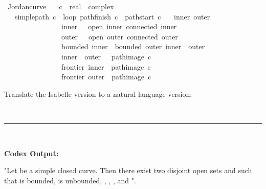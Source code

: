 \documentclass{article}
\begin{document}
\begin{boxB}
\begin{isabelle}
\isamarkupfalse \ Jordan{\isacharunderscore}{\kern0pt}curve{\isacharcolon}{\kern0pt}\isanewline
\ \ \ c\ {\isacharcolon}{\kern0pt}{\isacharcolon}{\kern0pt}\ {\isachardoublequoteopen}real\ {\isasymRightarrow}\ complex{\isachardoublequoteclose}\isanewline
\ \ \ {\isachardoublequoteopen}simple{\isacharunderscore}{\kern0pt}path\ c{\isachardoublequoteclose}\ \ loop{\isacharcolon}{\kern0pt}\ {\isachardoublequoteopen}pathfinish\ c\ {\isacharequal}{\kern0pt}\ pathstart\ c{\isachardoublequoteclose}\isanewline
\ \ \ inner\ outer\ \isanewline
\ \ \ \ \ \ \ \ \ \ \ \ \ \ \ \ {\isachardoublequoteopen}inner\ {\isasymnoteq}\ {\isacharbraceleft}{\kern0pt}{\isacharbraceright}{\kern0pt}{\isachardoublequoteclose}\ {\isachardoublequoteopen}open\ inner{\isachardoublequoteclose}\ {\isachardoublequoteopen}connected\ inner{\isachardoublequoteclose}\isanewline
\ \ \ \ \ \ \ \ \ \ \ \ \ \ \ \ {\isachardoublequoteopen}outer\ {\isasymnoteq}\ {\isacharbraceleft}{\kern0pt}{\isacharbraceright}{\kern0pt}{\isachardoublequoteclose}\ {\isachardoublequoteopen}open\ outer{\isachardoublequoteclose}\ {\isachardoublequoteopen}connected\ outer{\isachardoublequoteclose}\isanewline
\ \ \ \ \ \ \ \ \ \ \ \ \ \ \ \ {\isachardoublequoteopen}bounded\ inner{\isachardoublequoteclose}\ {\isachardoublequoteopen}{\isasymnot}\ bounded\ outer{\isachardoublequoteclose}\ {\isachardoublequoteopen}inner\ {\isasyminter}\ outer\ {\isacharequal}{\kern0pt}\ {\isacharbraceleft}{\kern0pt}{\isacharbraceright}{\kern0pt}{\isachardoublequoteclose}\isanewline
\ \ \ \ \ \ \ \ \ \ \ \ \ \ \ \ {\isachardoublequoteopen}inner\ {\isasymunion}\ outer\ {\isacharequal}{\kern0pt}\ {\isacharminus}{\kern0pt}\ path{\isacharunderscore}{\kern0pt}image\ c{\isachardoublequoteclose}\isanewline
\ \ \ \ \ \ \ \ \ \ \ \ \ \ \ \ {\isachardoublequoteopen}frontier\ inner\ {\isacharequal}{\kern0pt}\ path{\isacharunderscore}{\kern0pt}image\ c{\isachardoublequoteclose}\isanewline
\ \ \ \ \ \ \ \ \ \ \ \ \ \ \ \ {\isachardoublequoteopen}frontier\ outer\ {\isacharequal}{\kern0pt}\ path{\isacharunderscore}{\kern0pt}image\ c{\isachardoublequoteclose}\end{isabelle}
Translate the Isabelle version to a natural language version:

\
\hrule
\

\textbf{Codex Output:}

"Let  be a simple closed curve. Then there exist two disjoint open sets  and  such that  is bounded,  is unbounded, , , , and ".
\end{boxB}
\end{document}
